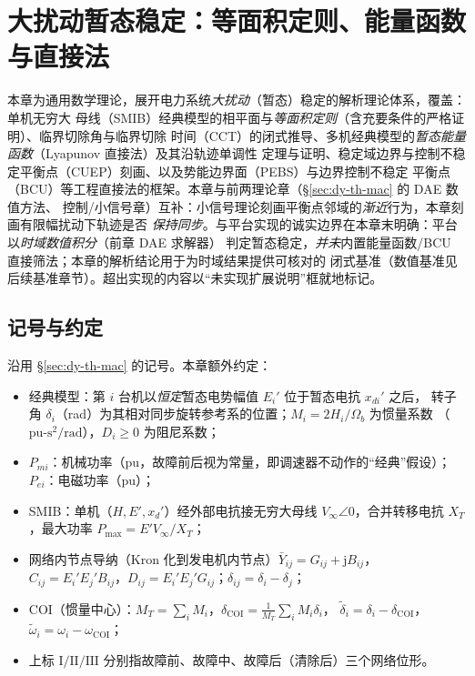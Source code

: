 
\section{大扰动暂态稳定：等面积定则、能量函数与直接法}\label{sec:dy-th-ts}

\begin{theorynote}
本章为通用数学理论，展开电力系统\emph{大扰动}（暂态）稳定的解析理论体系，覆盖：单机无穷大
母线（SMIB）经典模型的相平面与\emph{等面积定则}（含充要条件的严格证明）、临界切除角与临界切除
时间（CCT）的闭式推导、多机经典模型的\emph{暂态能量函数}（Lyapunov 直接法）及其沿轨迹单调性
定理与证明、稳定域边界与控制不稳定平衡点（CUEP）刻画、以及势能边界面（PEBS）与边界控制不稳定
平衡点（BCU）等工程直接法的框架。本章与前两理论章（\S\ref{sec:dy-th-mac} 的 DAE 数值方法、
控制/小信号章）互补：小信号理论刻画平衡点邻域的\emph{渐近}行为，本章刻画有限幅扰动下轨迹是否
\emph{保持同步}。与平台实现的诚实边界在本章末明确：平台以\emph{时域数值积分}（前章 DAE 求解器）
判定暂态稳定，\emph{并未}内置能量函数/BCU 直接筛法；本章的解析结论用于为时域结果提供可核对的
闭式基准（数值基准见后续基准章节）。超出实现的内容以“未实现扩展说明”框就地标记。
\end{theorynote}

\subsection{记号与约定}\label{sec:dy-th-ts-notation}
沿用 \S\ref{sec:dy-th-mac} 的记号。本章额外约定：
\begin{itemize}
  \item 经典模型：第 $i$ 台机以\emph{恒定}暂态电势幅值 $E_i'$ 位于暂态电抗 $x_{di}'$ 之后，
        转子角 $\delta_i$（rad）为其相对同步旋转参考系的位置；$M_i=2H_i/\Omega_b$ 为惯量系数
        （$\mathrm{pu\text{-}s^2/rad}$），$D_i\ge0$ 为阻尼系数；
  \item $P_{mi}$：机械功率（pu，故障前后视为常量，即调速器不动作的“经典”假设）；
        $P_{ei}$：电磁功率（pu）；
  \item SMIB：单机（$H,E',x_d'$）经外部电抗接无穷大母线 $V_\infty\angle0$，合并转移电抗
        $X_T$，最大功率 $P_{\max}=E'V_\infty/X_T$；
  \item 网络内节点导纳（Kron 化到发电机内节点）$\bar Y_{ij}=G_{ij}+\mathrm jB_{ij}$，
        $C_{ij}=E_i'E_j'B_{ij}$，$D_{ij}=E_i'E_j'G_{ij}$；$\delta_{ij}=\delta_i-\delta_j$；
  \item COI（惯量中心）：$M_T=\sum_iM_i$，$\delta_{\mathrm{COI}}=\frac1{M_T}\sum_iM_i\delta_i$，
        $\tilde\delta_i=\delta_i-\delta_{\mathrm{COI}}$，$\tilde\omega_i=\omega_i-\omega_{\mathrm{COI}}$；
  \item 上标 $\mathrm{I/II/III}$ 分别指故障前、故障中、故障后（清除后）三个网络位形。
\end{itemize}


